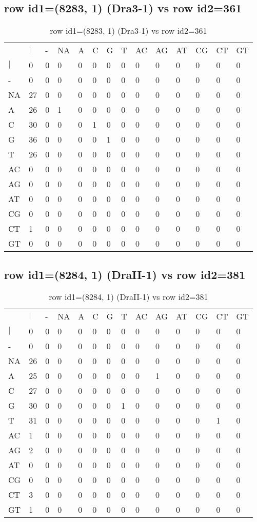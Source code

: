 \subsection{row id1=(8283, 1) (Dra3-1) vs row id2=361}
\begin{center}
\begin{longtable}{|l|l|l|l|l|l|l|l|l|l|l|l|l|l|}
\caption{row id1=(8283, 1) (Dra3-1) vs row id2=361} \label{table_dm252}\\
\hline
\\
\hline
&$|$&-&NA&A&C&G&T&AC&AG&AT&CG&CT&GT\\
$|$&0&0&0&0&0&0&0&0&0&0&0&0&0\\
-&0&0&0&0&0&0&0&0&0&0&0&0&0\\
NA&27&0&0&0&0&0&0&0&0&0&0&0&0\\
A&26&0&1&0&0&0&0&0&0&0&0&0&0\\
C&30&0&0&0&1&0&0&0&0&0&0&0&0\\
G&36&0&0&0&0&1&0&0&0&0&0&0&0\\
T&26&0&0&0&0&0&0&0&0&0&0&0&0\\
AC&0&0&0&0&0&0&0&0&0&0&0&0&0\\
AG&0&0&0&0&0&0&0&0&0&0&0&0&0\\
AT&0&0&0&0&0&0&0&0&0&0&0&0&0\\
CG&0&0&0&0&0&0&0&0&0&0&0&0&0\\
CT&1&0&0&0&0&0&0&0&0&0&0&0&0\\
GT&0&0&0&0&0&0&0&0&0&0&0&0&0\\
\hline
\end{longtable}
\end{center}

\subsection{row id1=(8284, 1) (DraII-1) vs row id2=381}
\begin{center}
\begin{longtable}{|l|l|l|l|l|l|l|l|l|l|l|l|l|l|}
\caption{row id1=(8284, 1) (DraII-1) vs row id2=381} \label{table_dm254}\\
\hline
\\
\hline
&$|$&-&NA&A&C&G&T&AC&AG&AT&CG&CT&GT\\
$|$&0&0&0&0&0&0&0&0&0&0&0&0&0\\
-&0&0&0&0&0&0&0&0&0&0&0&0&0\\
NA&26&0&0&0&0&0&0&0&0&0&0&0&0\\
A&25&0&0&0&0&0&0&0&1&0&0&0&0\\
C&27&0&0&0&0&0&0&0&0&0&0&0&0\\
G&30&0&0&0&0&0&1&0&0&0&0&0&0\\
T&31&0&0&0&0&0&0&0&0&0&0&1&0\\
AC&1&0&0&0&0&0&0&0&0&0&0&0&0\\
AG&2&0&0&0&0&0&0&0&0&0&0&0&0\\
AT&0&0&0&0&0&0&0&0&0&0&0&0&0\\
CG&0&0&0&0&0&0&0&0&0&0&0&0&0\\
CT&3&0&0&0&0&0&0&0&0&0&0&0&0\\
GT&1&0&0&0&0&0&0&0&0&0&0&0&0\\
\hline
\end{longtable}
\end{center}

